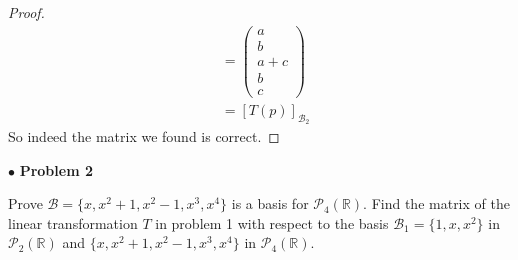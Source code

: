 \documentclass{article}
\begin{document}
\begin{proof}
\begin{align*}
&= \begin{pmatrix} a \\ b \\ a+c \\ b \\ c \end{pmatrix} \\
&= [T(p)]_{\mathcal{B}_2}
\end{align*}
So indeed the matrix we found is correct.
\end{proof}

\newpage
$ \bullet$ \textbf{Problem 2}
\medskip

\begin{itshape}
Prove $\mathcal{B} = \{x,x^2+1,x^2-1,x^3,x^4\}$ is a basis for $\mathcal{P}_4(\mathbb{R})$. Find the matrix of the linear transformation $T$ in problem 1 with respect to the basis $\mathcal{B}_1 = \{ 1,x,x^2 \} $ in $\mathcal{P}_2(\mathbb{R})$ and $ \{x, x^2+1, x^2-1, x^3, x^4 \}$ in $\mathcal{P}_4(\mathbb{R})$.
\end{itshape}
\medskip
\end{document}
